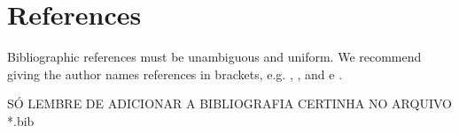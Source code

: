 \documentclass[12pt]{article}
\begin{document}
\section{References}

Bibliographic references must be unambiguous and uniform.  We recommend giving
the author names references in brackets, e.g. \cite{knuth:84},
\cite{boulic:91}, and \cite{smith:99} \cite{barbosa:97} e \cite{rau:11}.
\cite{kishimoto:08}

SÓ LEMBRE DE ADICIONAR A BIBLIOGRAFIA CERTINHA NO ARQUIVO *.bib



\end{document}
